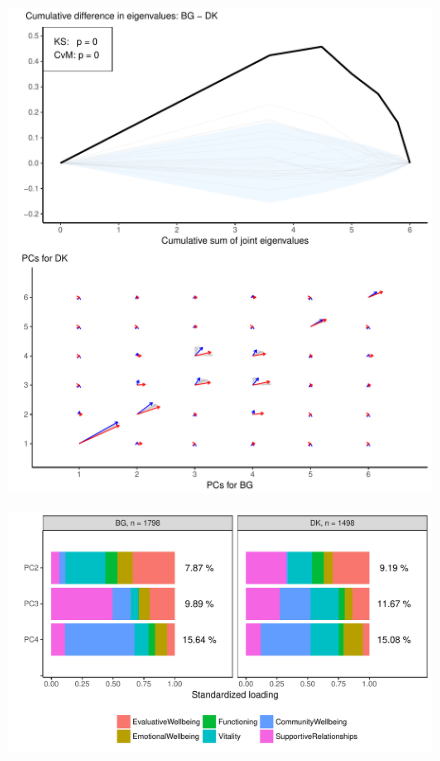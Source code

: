 \documentclass[]{interact}
\theoremstyle{plain}%
\theoremstyle{definition}
\theoremstyle{remark}
\begin{document}
\begin{figure}[H]
\center
\includegraphics[scale=0.8]{Figure7_PCADSC_v3.pdf}
\caption{}%
\label{plotBG.cehair}
\end{figure}

\begin{figure}[H]
\center
\includegraphics[scale=0.8]{Figure8_PCADSC_v3.pdf}
\caption{}%
\label{plotBG.pancake}
\end{figure}
\end{document}
